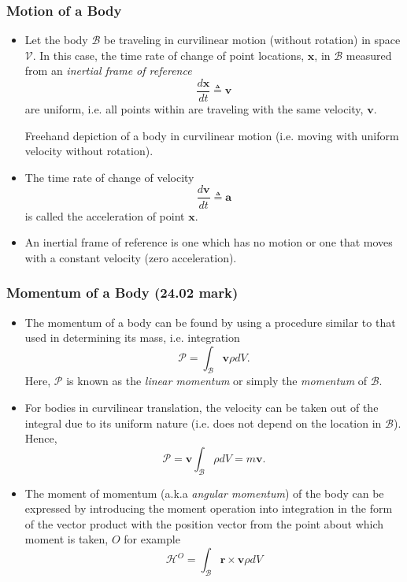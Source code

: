 \documentclass[11pt]{article}
\begin{document}
\subsubsection*{Motion of a Body}
\label{sec:org52107cf}
\begin{itemize}
\item Let the body \(\mathcal{B}\) be traveling in curvilinear motion (without rotation) in space \(\mathcal{V}\). In this case, the time rate of change of point locations, \(\boldsymbol{x}\), in \(\mathcal{B}\) measured from an \emph{inertial frame of reference}
$$ \frac{d \boldsymbol{x}}{dt} \triangleq \boldsymbol{v} $$
are uniform, i.e. all points within are traveling with the same velocity,  \(\boldsymbol{v}\).

Freehand depiction of a body in curvilinear motion (i.e. moving with uniform velocity without rotation).

\item The time rate of change of velocity
$$ \frac{d \boldsymbol{v}}{dt} \triangleq \boldsymbol{a} $$
is called the acceleration of point \(\boldsymbol{x}\).

\item An inertial frame of reference is one which has no motion or one that moves with a constant velocity (zero acceleration).
\end{itemize}
\subsubsection*{Momentum of a Body (\textbf{24.02 mark})}
\label{sec:org3de5efc}
\begin{itemize}
\item The momentum of a body can be found by using a procedure similar to that used in determining its mass, i.e. integration
$$ \mathcal{P} = \int_\mathcal{B} \boldsymbol{v} \rho dV .$$
Here, \(\mathcal{P}\) is known as the \emph{linear momentum} or simply the \emph{momentum} of \(\mathcal{B}\).
\item For bodies in curvilinear translation, the velocity can be taken out of the integral due to its uniform nature (i.e. does not depend on the location in \(\mathcal{B}\)). Hence,
$$  \mathcal{P} = \boldsymbol{v} \int_\mathcal{B} \rho dV = m \boldsymbol{v}. $$
\item The moment of momentum (a.k.a \emph{angular momentum}) of the body can be expressed by introducing the moment operation into integration in the form of the vector product with the position vector from the point about which moment is taken, \(O\) for example
$$ \mathcal{H}^O = \int_\mathcal{B} \boldsymbol{r} \times \boldsymbol{v} \rho dV $$
\end{itemize}
\end{document}
